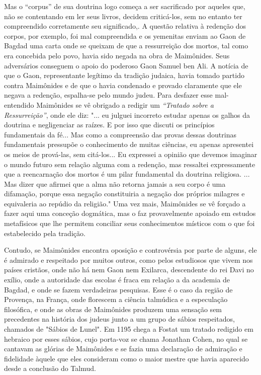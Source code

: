 Mas o ``corpus'' de sua doutrina logo começa a ser sacrificado por aqueles
que, não se contentando em ler seus livros, decidem criticá-los, sem no
entanto ter compreendido corretamente seu significado,. A questão
relativa à redenção dos corpos, por exemplo, foi mal compreendida e os
yemenitas en­viam ao Gaon de Bagdad uma carta onde se queixam de que a
ressurreição dos mortos, tal como era concebida pelo povo, havia sido
negada na obra de
Maimônides. Seus adversários conseguem o apoio do poderoso Gaon Samuel
ben Ali. A notícia de que o Gaon, representante legítimo da tradição
judaica, havia tomado partido contra Maimônides e de que o havia
condenado e prova­do claramente que ele negava a redenção, espalha-se
pelo mundo judeu. Para desfazer esse mal-entendido Maimônides se vê
obrigado a redigir um \emph{``Tratado sobre a Ressurreição''}, onde ele
diz: "... eu julguei incorreto estudar apenas os galhos da doutrina e
negligenciar as raízes. E por isso que discuti os princí­pios
fundamentais da fé... Mas como a compreensão das provas dessas
doutri­nas fundamentais pressupõe o conhecimento de muitas ciências, eu
apenas apre­sentei os meios de prová-las, sem citá-los... Eu expressei a
opinião que deve­mos imaginar o mundo futuro sem relação alguma com a
redenção, mas ressal­tei expressamente que a reencarnação dos mortos é
um pilar fundamental da doutrina religiosa. ... Mas dizer que afirmei
que a alma não retorna jamais a seu corpo é uma difamação, porque essa
negação constituiria a negação dos pró­prios milagres e equivaleria ao
repúdio da religião." Uma vez mais, Maimôni­des se vê forçado a fazer
aqui uma conceção dogmática, mas o faz provavel­mente apoiado em estudos
metafísicos que lhe permitem conciliar seus conhe­cimentos místicos com
o que foi estabelecido pela tradição.

Contudo, se Maimônides encontra oposição e controvérsia por par­te de
alguns, ele é admirado e respeitado por muitos outros, como pelos
estu­diosos que vivem nos países cristãos, onde não há nem Gaon nem
Exilarca, descendente do rei Davi no exílio, onde a autoridade das
escolas é fraca em relação a da academia de Bagdad, e onde se fazem
verdadeiras pesquisas. Esse é o caso da região de Provença, na França,
onde florescem a ciência talmúdica e a especulação filosófica, e onde as
obras de Maimônides produzem uma sen­sação sem precedentes na história
dos judeus junto a um grupo de sábios res­peitados, chamados de "Sábios
de Lunel". Em 1195 chega a Fostat um tratado redigido em hebraico por
esses sábios, cujo porta-voz se chama Jonathan Co­hen, no qual se
cantavam as glórias de Maimônides e se fazia uma declaração de admiração
e fidelidade àquele que eles consideram como o maior mestre que havia
aparecido desde a conclusão do Talmud.

